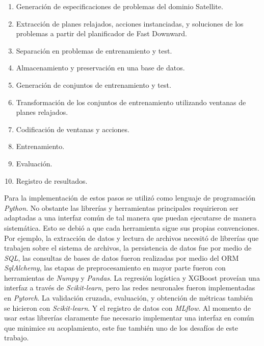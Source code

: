 \begin{enumerate}
    \item Generación de especificaciones de problemas del dominio Satellite.
    \item Extracción de planes relajados, acciones instanciadas, y soluciones de
    los problemas a partir del planificador de Fast Downward.
    \item Separación en problemas de entrenamiento y test.
    \item Almacenamiento y preservación en una base de datos.
    \item Generación de conjuntos de entrenamiento y test.
    \item Transformación de los conjuntos de entrenamiento utilizando ventanas
    de planes relajados.
    \item Codificación de ventanas y acciones.
    \item Entrenamiento.
    \item Evaluación.
    \item Registro de resultados.
\end{enumerate}

Para la implementación de estos pasos se utilizó como lenguaje de programación
\emph{Python}. No obstante las librerías y herramientas principales requirieron
ser adaptadas a una interfaz común de tal manera que puedan ejecutarse de manera
sistemática. Esto se debió a que cada herramienta sigue sus propias convenciones.
Por ejemplo, la extracción de datos y lectura de archivos necesitó de librerías
que trabajen sobre el sistema de archivos, la persistencia de datos fue por
medio de \emph{SQL}, las consultas de bases de datos fueron realizadas por medio
del ORM \emph{SqlAlchemy}, las etapas de preprocesamiento en mayor parte fueron
con herramientas de \emph{Numpy} y \emph{Pandas}. La regresión logística y
XGBoost proveían una interfaz a través de \emph{Scikit-learn}, pero las redes
neuronales fueron implementadas en \emph{Pytorch}. La validación cruzada,
evaluación, y obtención de métricas también se hicieron con \emph{Scikit-learn}.
Y el registro de datos con \emph{MLflow}. Al momento de usar estas librerías
claramente fue necesario implementar una interfaz en común que minimice su
acoplamiento, este fue también uno de los desafíos de este trabajo.